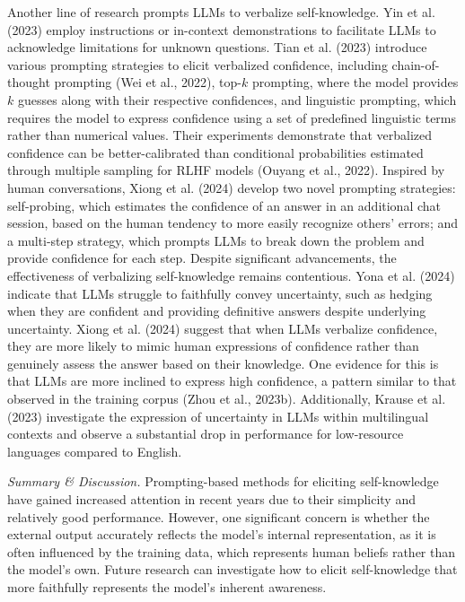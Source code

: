 Another line of research prompts LLMs to verbalize self-knowledge. Yin et al. (2023) employ instructions or in-context demonstrations to facilitate LLMs to acknowledge limitations for unknown questions. Tian et al. (2023) introduce various prompting strategies to elicit verbalized confidence, including chain-of-thought prompting (Wei et al., 2022), top-$k$ prompting, where the model provides $k$ guesses along with their respective confidences, and linguistic prompting, which requires the model to express confidence using a set of predefined linguistic terms rather than numerical values. Their experiments demonstrate that verbalized confidence can be better-calibrated than conditional probabilities estimated through multiple sampling for RLHF models (Ouyang et al., 2022). Inspired by human conversations, Xiong et al. (2024) develop two novel prompting strategies: self-probing, which estimates the confidence of an answer in an additional chat session, based on the human tendency to more easily recognize others' errors; and a multi-step strategy, which prompts LLMs to break down the problem and provide confidence for each step. Despite significant advancements, the effectiveness of verbalizing self-knowledge remains contentious. Yona et al. (2024) indicate that LLMs struggle to faithfully convey uncertainty, such as hedging when they are confident and providing definitive answers despite underlying uncertainty. Xiong et al. (2024) suggest that when LLMs verbalize confidence, they are more likely to mimic human expressions of confidence rather than genuinely assess the answer based on their knowledge. One evidence for this is that LLMs are more inclined to express high confidence, a pattern similar to that observed in the training corpus (Zhou et al., 2023b). Additionally, Krause et al. (2023) investigate the expression of uncertainty in LLMs within multilingual contexts and observe a substantial drop in performance for low-resource languages compared to English.

\emph{Summary \& Discussion.} Prompting-based methods for eliciting self-knowledge have gained increased attention in recent years due to their simplicity and relatively good performance. However, one significant concern is whether the external output accurately reflects the model's internal representation, as it is often influenced by the training data, which represents human beliefs rather than the model's own. Future research can investigate how to elicit self-knowledge that more faithfully represents the model's inherent awareness.

